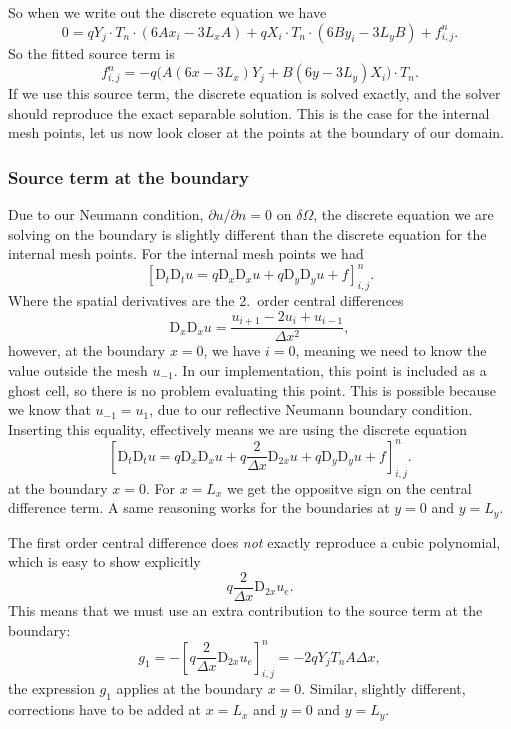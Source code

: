 \documentclass[a4paper, 11pt, notitlepage, english]{article}
\newcommand{\p}{\partial}
\newcommand{\D}{\mbox{D}}
\begin{document}
So when we write out the discrete equation we have
$$0 = q Y_j \cdot T_n \cdot(6Ax_i - 3L_x A) + qX_i\cdot T_n \cdot(6By_i - 3L_y B) + f_{i,j}^n.$$
So the fitted source term is
$$f_{i,j}^n = -q\bigg(A(6x - 3L_x)Y_j + B(6y - 3L_y)X_i\bigg)\cdot T_n.$$
If we use this source term, the discrete equation is solved exactly, and the solver should reproduce the exact separable solution. This is the case for the internal mesh points, let us now look closer at the points at the boundary of our domain.

\subsubsection*{Source term at the boundary}

Due to our Neumann condition, $\p u/\p n = 0$ on $\delta \Omega$, the discrete equation we are solving on the boundary is slightly different than the discrete equation for the internal mesh points. For the internal mesh points we had
$$[\D_t\D_t u = q \D_x \D_x u + q \D_y \D_y u + f]^{n}_{i,j}.$$
Where the spatial derivatives are the 2.\ order central differences
$$\D_x \D_x u = \frac{u_{i+1} - 2u_i + u_{i-1}}{\Delta x^2},$$
however, at the boundary $x = 0$, we have $i=0$, meaning we need to know the value outside the mesh $u_{-1}$. In our implementation, this point is included as a ghost cell, so there is no problem evaluating this point. This is possible because we know that $u_{-1} = u_{1}$, due to our reflective Neumann boundary condition. Inserting this equality, effectively means we are using the discrete equation
$$[\D_t\D_t u = q \D_x \D_x u + q\frac{2}{\Delta x} \D_{2x}u +  q \D_y \D_y u + f]^{n}_{i,j}.$$
at the boundary $x = 0$. For $x=L_x$ we get the oppositve sign on the central difference term. A same reasoning works for the boundaries at $y=0$ and $y=L_y$.

The first order central difference does \emph{not} exactly reproduce a cubic polynomial, which is easy to show explicitly
$$q\frac{2}{\Delta x} \D_{2x} u_e.$$
This means that we must use an extra contribution to the source term at the boundary:
$$g_1 = -[q\frac{2}{\Delta x} \D_{2x} u_e]_{i,j}^n = -2qY_jT_n A \Delta x,$$
the expression $g_1$ applies at the boundary $x = 0$. Similar, slightly different, corrections have to be added at $x=L_x$ and $y=0$ and $y=L_y$.
\end{document}
